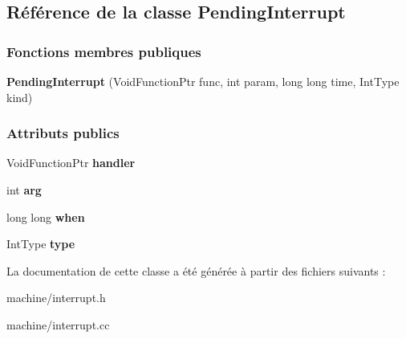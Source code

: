 \hypertarget{class_pending_interrupt}{}\subsection{Référence de la classe Pending\+Interrupt}
\label{class_pending_interrupt}
\subsubsection*{Fonctions membres publiques}
\begin{DoxyCompactItemize}
\item 
\hypertarget{class_pending_interrupt_adcb5308d9a24cac163a73254e3da76cb}{}\label{class_pending_interrupt_adcb5308d9a24cac163a73254e3da76cb} 
{\bfseries Pending\+Interrupt} (Void\+Function\+Ptr func, int param, long long time, Int\+Type kind)
\end{DoxyCompactItemize}
\subsubsection*{Attributs publics}
\begin{DoxyCompactItemize}
\item 
\hypertarget{class_pending_interrupt_a4e39241c89b2e3040286333e9f83ea7d}{}\label{class_pending_interrupt_a4e39241c89b2e3040286333e9f83ea7d} 
Void\+Function\+Ptr {\bfseries handler}
\item 
\hypertarget{class_pending_interrupt_a6484e4d50ddf69562125af75f31bda5d}{}\label{class_pending_interrupt_a6484e4d50ddf69562125af75f31bda5d} 
int {\bfseries arg}
\item 
\hypertarget{class_pending_interrupt_a182f9d9179ea53547d19e96a2312f10a}{}\label{class_pending_interrupt_a182f9d9179ea53547d19e96a2312f10a} 
long long {\bfseries when}
\item 
\hypertarget{class_pending_interrupt_a1ffee584e6fd0f25be17d01c4f5a5151}{}\label{class_pending_interrupt_a1ffee584e6fd0f25be17d01c4f5a5151} 
Int\+Type {\bfseries type}
\end{DoxyCompactItemize}


La documentation de cette classe a été générée à partir des fichiers suivants \+:\begin{DoxyCompactItemize}
\item 
machine/interrupt.\+h\item 
machine/interrupt.\+cc\end{DoxyCompactItemize}
